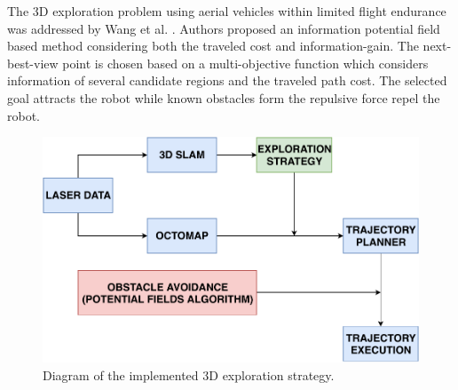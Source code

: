 The 3D exploration problem using aerial vehicles within limited flight endurance was addressed by Wang et al. \cite{Wang2019}. Authors proposed an information potential field based method considering both the traveled cost and information-gain. The next-best-view point is chosen based on a
multi-objective function which considers information of several
candidate regions and the traveled path cost. The selected goal
attracts the robot while known obstacles form the repulsive
force repel the robot.

\begin{figure}[t!]
	\centering
	\includegraphics[width=1.0\columnwidth]{./pictures/3D_strategy.pdf}	
	\caption{Diagram of the implemented 3D exploration strategy.}
	\label{fig:3D_strategy}
\end{figure}
